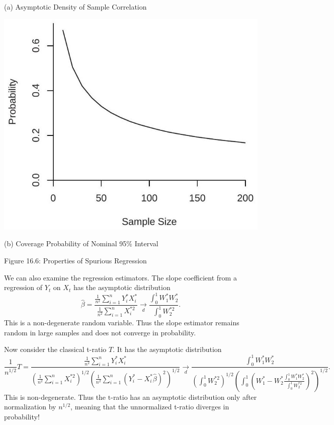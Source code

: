 \documentclass[10pt]{article}
\begin{document}
(a) Asymptotic Density of Sample Correlation

\includegraphics[max width=\textwidth]{2022_10_23_e99fc7c58db661c6f219g-27(1)}

(b) Coverage Probability of Nominal 95\% Interval

Figure 16.6: Properties of Spurious Regression

We can also examine the regression estimators. The slope coefficient from a regression of $Y_{t}$ on $X_{t}$ has the asymptotic distribution
$$
\widehat{\beta}=\frac{\frac{1}{n^{2}} \sum_{i=1}^{n} Y_{i}^{*} X_{i}^{*}}{\frac{1}{n^{2}} \sum_{i=1}^{n} X_{i}^{* 2}} \underset{d}{\longrightarrow} \frac{\int_{0}^{1} W_{1}^{*} W_{2}^{*}}{\int_{0}^{1} W_{2}^{* 2}} .
$$
This is a non-degenerate random variable. Thus the slope estimator remains random in large samples and does not converge in probability.

Now consider the classical t-ratio $T$. It has the asymptotic distribution
$$
\frac{1}{n^{1 / 2}} T=\frac{\frac{1}{n^{2}} \sum_{i=1}^{n} Y_{i}^{*} X_{i}^{*}}{\left(\frac{1}{n^{2}} \sum_{i=1}^{n} X_{i}^{* 2}\right)^{1 / 2}\left(\frac{1}{n^{2}} \sum_{i=1}^{n}\left(Y_{i}^{*}-X_{i}^{*} \widehat{\beta}\right)^{2}\right)^{1 / 2}} \underset{d}{\rightarrow} \frac{\int_{0}^{1} W_{1}^{*} W_{2}^{*}}{\left(\int_{0}^{1} W_{2}^{* 2}\right)^{1 / 2}\left(\int_{0}^{1}\left(W_{1}^{*}-W_{2}^{*} \frac{\int_{0}^{1} W_{1}^{*} W_{2}^{*}}{\int_{0}^{1} W_{2}^{* 2}}\right)^{2}\right)^{1 / 2}} .
$$
This is non-degenerate. Thus the $\mathrm{t}$-ratio has an asymptotic distribution only after normalization by $n^{1 / 2}$, meaning that the unnormalized t-ratio diverges in probability!
\end{document}
